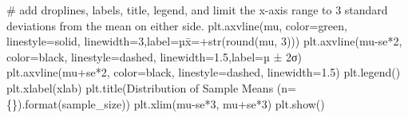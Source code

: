 \documentclass[
  letterpaper,
  DIV=11,
  numbers=noendperiod]{scrreprt}
\newenvironment{Shaded}{\begin{snugshade}}{\end{snugshade}}
\newcommand{\BuiltInTok}[1]{\textcolor[rgb]{0.00,0.23,0.31}{#1}}
\newcommand{\CommentTok}[1]{\textcolor[rgb]{0.37,0.37,0.37}{#1}}
\newcommand{\DecValTok}[1]{\textcolor[rgb]{0.68,0.00,0.00}{#1}}
\newcommand{\FloatTok}[1]{\textcolor[rgb]{0.68,0.00,0.00}{#1}}
\newcommand{\NormalTok}[1]{\textcolor[rgb]{0.00,0.23,0.31}{#1}}
\newcommand{\OperatorTok}[1]{\textcolor[rgb]{0.37,0.37,0.37}{#1}}
\newcommand{\SpecialCharTok}[1]{\textcolor[rgb]{0.37,0.37,0.37}{#1}}
\newcommand{\StringTok}[1]{\textcolor[rgb]{0.13,0.47,0.30}{#1}}
\begin{document}
\begin{Shaded}
\begin{Highlighting}[]
    \CommentTok{\# add droplines, labels, title, legend, and limit the x{-}axis range to 3 standard deviations from the mean on either side.}
\NormalTok{    plt.axvline(mu, color}\OperatorTok{=}\StringTok{\textquotesingle{}green\textquotesingle{}}\NormalTok{, linestyle}\OperatorTok{=}\StringTok{\textquotesingle{}solid\textquotesingle{}}\NormalTok{, linewidth}\OperatorTok{=}\DecValTok{3}\NormalTok{,label}\OperatorTok{=}\StringTok{\textquotesingle{}µx̄=\textquotesingle{}}\OperatorTok{+}\BuiltInTok{str}\NormalTok{(}\BuiltInTok{round}\NormalTok{(mu, }\DecValTok{3}\NormalTok{)))}
\NormalTok{    plt.axvline(mu}\OperatorTok{{-}}\NormalTok{se}\OperatorTok{*}\DecValTok{2}\NormalTok{, color}\OperatorTok{=}\StringTok{\textquotesingle{}black\textquotesingle{}}\NormalTok{, linestyle}\OperatorTok{=}\StringTok{\textquotesingle{}dashed\textquotesingle{}}\NormalTok{, linewidth}\OperatorTok{=}\FloatTok{1.5}\NormalTok{,label}\OperatorTok{=}\StringTok{\textquotesingle{}µ ± 2σ\textquotesingle{}}\NormalTok{)}
\NormalTok{    plt.axvline(mu}\OperatorTok{+}\NormalTok{se}\OperatorTok{*}\DecValTok{2}\NormalTok{, color}\OperatorTok{=}\StringTok{\textquotesingle{}black\textquotesingle{}}\NormalTok{, linestyle}\OperatorTok{=}\StringTok{\textquotesingle{}dashed\textquotesingle{}}\NormalTok{, linewidth}\OperatorTok{=}\FloatTok{1.5}\NormalTok{)}
\NormalTok{    plt.legend()}
\NormalTok{    plt.xlabel(xlab)    }
\NormalTok{    plt.title(}\StringTok{\textquotesingle{}Distribution of Sample Means (n=}\SpecialCharTok{\{\}}\StringTok{)\textquotesingle{}}\NormalTok{.}\BuiltInTok{format}\NormalTok{(sample\_size))}
\NormalTok{    plt.xlim(mu}\OperatorTok{{-}}\NormalTok{se}\OperatorTok{*}\DecValTok{3}\NormalTok{, mu}\OperatorTok{+}\NormalTok{se}\OperatorTok{*}\DecValTok{3}\NormalTok{)}
\NormalTok{    plt.show()  }
\end{Highlighting}
\end{Shaded}

\begin{Shaded}
\end{Shaded}
\end{document}
